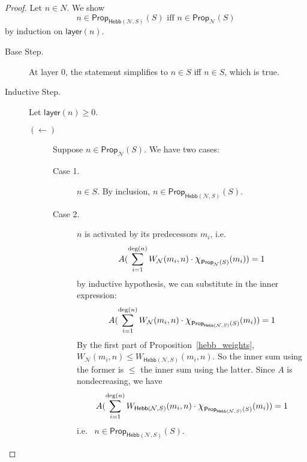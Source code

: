 \documentclass[letterpaper]{article}
\theoremstyle{definition}
\newcommand*{\bigchi}{\mbox{\Large$\chi$}}%
\newcommand{\degree}[1]{\mathrm{deg}(#1)}
\newcommand{\layer}[1]{\mathsf{layer}(#1)}
\newcommand{\Net}{\mathcal{N}}
\newcommand{\Prop}{\mathsf{Prop}}
\newcommand{\Hebb}[2]{\mathsf{Hebb}(#1, #2)}
\begin{document}
\prophebbself*
\begin{proof}
    Let $n \in N$.  We show
    \[
        n \in \Prop_{\Hebb{\Net}{S}}(S) \mbox{ iff } n \in \Prop_\Net(S)
    \]
    by induction on $\layer{n}$.
    
    \begin{description}
        \item[Base Step.] At layer $0$, the statement simplifies to $n \in S$ iff $n \in S$, which is true.
        \item[Inductive Step.] Let $\layer{n} \geq 0$.
        \begin{description}

            \item[$(\leftarrow)$] Suppose $n \in \Prop_\Net(S)$.  We have two cases:
            \begin{description}
                \item[Case 1.] $n \in S$.  By inclusion, $n \in \Prop_{\Hebb{\Net}{S}}(S)$.
                \item[Case 2.] $n$ is activated by its predecessors $m_i$, i.e.
                \[
                    A(\sum_{i=1}^{\degree{n}} W_\Net(m_i, n) \cdot \bigchi_{\Prop_\Net(S)}(m_i)) = 1
                \]
                by inductive hypothesis, we can substitute in the inner expression:
                \[
                    A(\sum_{i=1}^{\degree{n}} W_\Net(m_i, n) \cdot \bigchi_{\Prop_{\Hebb{\Net}{S}}(S)}(m_i)) = 1
                \]
                By the first part of Proposition~\ref{hebb_weights}, $W_\Net(m_i, n) \leq W_{\Hebb{\Net}{S}}(m_i, n)$.  So the inner sum using the former is $\leq$ the inner sum using the latter.  Since $A$ is nondecreasing, we have
                \[
                    A(\sum_{i=1}^{\degree{n}} W_{\Hebb{\Net}{S}}(m_i, n) \cdot \bigchi_{\Prop_{\Hebb{\Net}{S}}(S)}(m_i)) = 1
                \]
                i.e.~ $n \in \Prop_{\Hebb{\Net}{S}}(S)$.
            \end{description}


\end{description}
\end{description}
\end{proof}
\end{document}
